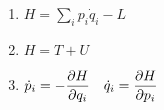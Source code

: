 

\vspace*{\fill}
\centering

\begin{enumerate}
    \item $\displaystyle H = \sum_{i} p_{i}\dot{q}_{i} - L$ 
    \item $\displaystyle H = T + U$
    \item $\displaystyle \dot{p}_{i} = -\pdv{H}{q_{i}} \quad \dot{q}_{i} = \pdv{H}{p_{i}}$
\end{enumerate}

\centering
\vspace*{\fill}


